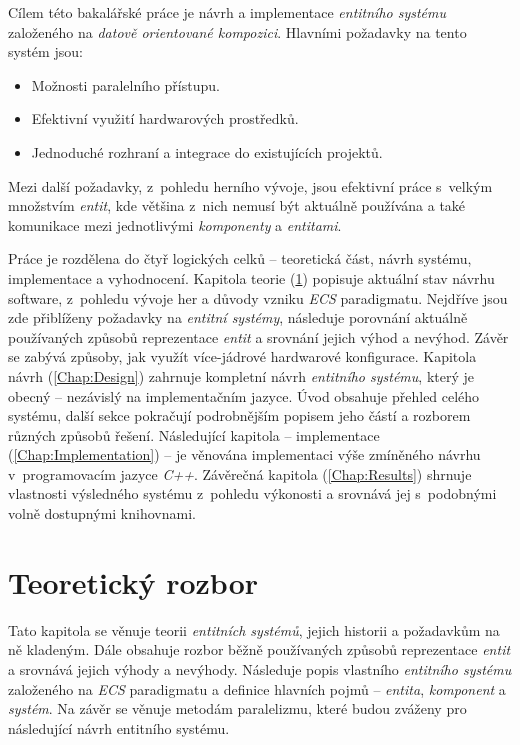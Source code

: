 Cílem této bakalářské práce je návrh a implementace \emph{entitního systému} založeného na \emph{datově orientované kompozici}. Hlavními požadavky na tento systém jsou: 
\begin{itemize}
	\item Možnosti paralelního přístupu.
	\item Efektivní využití hardwarových prostředků.
	\item Jednoduché rozhraní a integrace do existujících projektů.
\end{itemize}
Mezi další požadavky, z~pohledu herního vývoje, jsou efektivní práce s~velkým množstvím \emph{entit}, kde většina z~nich nemusí být aktuálně používána a také komunikace mezi jednotlivými \emph{komponenty} a \emph{entitami}.

Práce je rozdělena do čtyř logických celků -- teoretická část, návrh systému, implementace a vyhodnocení. Kapitola teorie (\ref{Chap:Theory}) popisuje aktuální stav návrhu software, z~pohledu vývoje her a důvody vzniku \emph{ECS} paradigmatu. Nejdříve jsou zde přiblíženy požadavky na \emph{entitní systémy}, následuje porovnání aktuálně používaných způsobů reprezentace \emph{entit} a srovnání jejich výhod a nevýhod. Závěr se zabývá způsoby, jak využít více-jádrové hardwarové konfigurace. Kapitola návrh (\ref{Chap:Design}) zahrnuje kompletní návrh \emph{entitního systému}, který je obecný -- nezávislý na implementačním jazyce. Úvod obsahuje přehled celého systému, další sekce pokračují podrobnějším popisem jeho částí a rozborem různých způsobů řešení. Následující kapitola -- implementace (\ref{Chap:Implementation}) -- je věnována implementaci výše zmíněného návrhu v~programovacím jazyce \emph{C++}. Závěrečná kapitola (\ref{Chap:Results}) shrnuje vlastnosti výsledného systému z~pohledu výkonosti a srovnává jej s~podobnými volně dostupnými knihovnami.

\chapter{Teoretický rozbor}
\label{Chap:Theory}

Tato kapitola se věnuje teorii \emph{entitních systémů}, jejich historii a požadavkům na ně kladeným. Dále obsahuje rozbor běžně používaných způsobů reprezentace \emph{entit} a srovnává jejich výhody a nevýhody. Následuje popis vlastního \emph{entitního systému} založeného na \emph{ECS} paradigmatu a definice hlavních pojmů -- \emph{entita}, \emph{komponent} a \emph{systém}. Na závěr se věnuje metodám paralelizmu, které budou zváženy pro následující návrh entitního systému.

